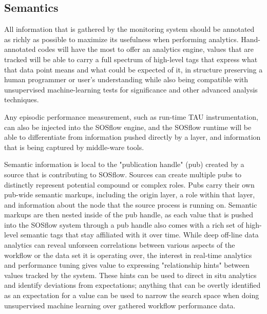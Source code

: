 
\subsection{Semantics}
All information that is gathered by the monitoring system should be
annotated as richly as possible to maximize its usefulness when
performing analytics.  Hand-annotated codes will have the most to
offer an analytics engine, values that are tracked will be able to
carry a full spectrum of high-level tags that express what that data
point means and what could be expected of it, in structure preserving
a human programmer or user's understanding while also being compatible
with unsupervised machine-learning tests for significance and other
advanced analysis techniques.

Any episodic performance measurement, such as run-time TAU
instrumentation, can also be injected into the SOSflow engine, and the
SOSflow runtime will be able to differentiate from information pushed
directly by a layer, and information that is being captured by
middle-ware tools.


Semantic information is local to the "publication handle" (pub)
created by a source that is contributing to SOSflow.  Sources can
create multiple pubs to distinctly represent potential compound or
complex roles. Pubs carry their own pub-wide semantic markups,
including the origin layer, a role within that layer, and information
about the node that the source process is running on. Semantic markups
are then nested inside of the pub handle, as each value that is pushed
into the SOSflow system through a pub handle also comes with a rich
set of high-level semantic tags that stay affiliated with it over
time. While deep off-line data analytics can reveal unforseen
correlations between various aspects of the workflow or the data set
it is operating over, the interest in real-time analytics and
performance tuning gives value to expressing "relationship hints"
between values tracked by the system. These hints can be used to
direct in situ analytics and identify deviations from expectations;
anything that can be overtly identified as an expectation for a value
can be used to narrow the search space when doing unsupervised machine
learning over gathered workflow performance data.

